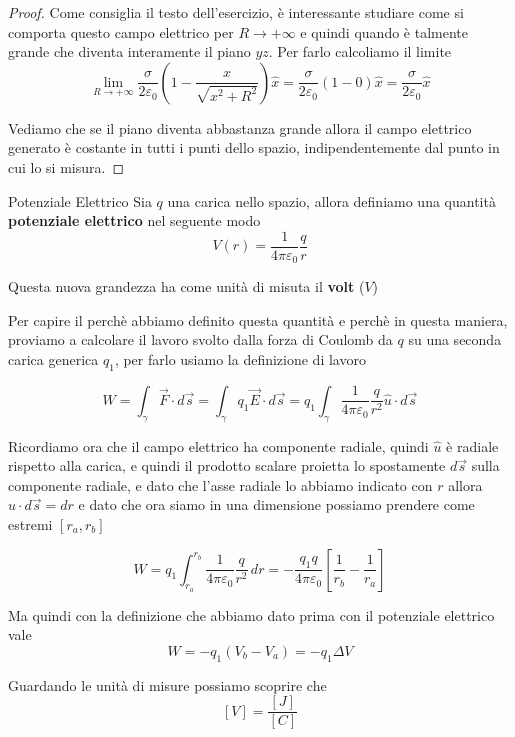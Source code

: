 \documentclass{rapport}
\begin{document}
\begin{proof}
Come consiglia il testo dell'esercizio, è interessante studiare come si comporta questo campo elettrico per $R\to+\infty$ e quindi quando è talmente grande che diventa interamente il piano $yz$. Per farlo calcoliamo il limite 
\[
\lim_{R\to+\infty} \dfrac{\sigma }{2\varepsilon_0} \left(1 -\dfrac{x}{\sqrt{x^2+R^2}} \right)\hat{x} = \dfrac{\sigma }{2\varepsilon_0} \left(1 -0 \right)\hat{x} =  \dfrac{\sigma }{2\varepsilon_0} \hat{x}
\]

Vediamo che se il piano diventa abbastanza grande allora il campo elettrico generato è costante in tutti i punti dello spazio, indipendentemente dal punto in cui lo si misura.
\end{proof}


\newpage
\begin{definizione}{Potenziale Elettrico}{}
  Sia $q$ una carica nello spazio, allora definiamo una quantità \textbf{potenziale elettrico} nel seguente modo 
  \[
  V(r) = \dfrac{1}{4\pi\varepsilon_0} \dfrac{q}{r}
  \]

  Questa nuova grandezza ha come unità di misuta il \textbf{volt} ($V$)
\end{definizione}

Per capire il perchè abbiamo definito questa quantità e perchè in questa maniera, proviamo a calcolare il lavoro svolto dalla forza di Coulomb da $q$ su una seconda carica generica $q_1$, per farlo usiamo la definizione di lavoro

\[
W = \int_{\gamma} \vec{F} \cdot d\vec{s} = \int_{\gamma} q_1\vec{E} \cdot d\vec{s}  = q_1\int_{\gamma} \dfrac{1}{4\pi\varepsilon_0} \dfrac{q}{r^2} \hat{u} \cdot d\vec{s}  
\]


Ricordiamo ora che il campo elettrico ha componente radiale, quindi $\hat{u}$ è radiale rispetto alla carica, e quindi il prodotto scalare proietta lo spostamente $d\vec{s}$ sulla componente radiale, e dato che l'asse radiale lo abbiamo indicato con $r$ allora $\hat{u}\cdot d\vec{s} = dr$ e dato che ora siamo in una dimensione possiamo prendere come estremi $[r_a, r_b]$ 


\[
W = q_1 \int_{r_a}^{r_b} \dfrac{1}{4\pi\varepsilon_0} \dfrac{q}{r^2} \,dr = -\dfrac{q_1q}{4\pi\varepsilon_0} \left[\dfrac{1}{r_b}-\dfrac{1}{r_a}\right]
\]

Ma quindi con la definizione che abbiamo dato prima con il potenziale elettrico vale
\[
W = -q_1(V_b-V_a) = -q_1 \Delta V
\]

Guardando le unità di misure possiamo scoprire che 
\[
[V] = \dfrac{[J]}{[C]}
\]
\end{document}
